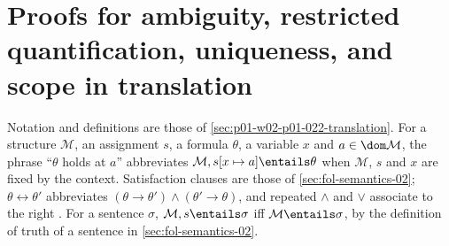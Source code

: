 \section{Proofs for ambiguity, restricted quantification, uniqueness, and scope in translation}
\label{sec:annex-p01-w02-p01-022-translation}

Notation and definitions are those of
\cref{sec:p01-w02-p01-022-translation}. For a structure \(\mathcal M\), an
assignment \(s\), a formula \(\theta\), a variable \(x\) and
\(a\in\dom\mathcal M\), the phrase ``\(\theta\) holds at \(a\)'' abbreviates
\(\mathcal M,s[x\mapsto a]\entails\theta\) when \(\mathcal M\), \(s\) and
\(x\) are fixed by the context. Satisfaction clauses are those of
\cref{sec:fol-semantics-02}; \(\theta\leftrightarrow\theta'\) abbreviates
\((\theta\to\theta')\land(\theta'\to\theta)\), and repeated \(\land\) and
\(\lor\) associate to the right
\cite[ch.~``Propositional Syntax and Semantics'', definition ``Defined
connectives'' and the association convention preceding
it]{FrozenFormalLogicFormalizing}. For a sentence \(\sigma\),
\(\mathcal M,s\entails\sigma\) iff \(\mathcal M\entails\sigma\), by the
definition of truth of a sentence in \cref{sec:fol-semantics-02}.

